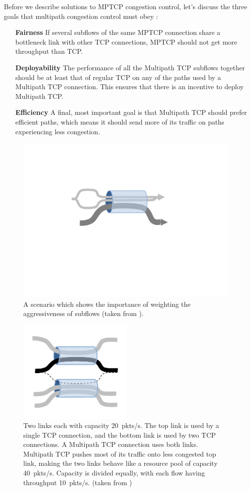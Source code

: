 Before we describe solutions to MPTCP congestion control, let's discuss the three goals that
multipath congestion control must obey \cite{mptcp-cc}:
\begin{enumerate}
\item[\textbf{Fairness}] If several subflows of the same MPTCP connection
share a bottleneck link with other TCP connections, MPTCP should not
get more throughput than TCP. 
\item[\textbf{Deployability}] The performance of all the
Multipath TCP subflows together should be at least that of regular TCP
on any of the paths used by a Multipath TCP connection.  This ensures
that there is an incentive to deploy Multipath TCP. 
\item[\textbf{Efficiency}] A final, most important goal is that Multipath TCP should prefer efficient paths,
which means it should send more of its traffic on paths experiencing
less congestion.
\end{enumerate}

\begin{figure}[t]
\centering
\includegraphics*[width=0.45\columnwidth,bb=167 245 509 380]{figures/1bottleneck}
\caption{A scenario which shows the importance of weighting the aggressiveness of subflows (taken from \cite{mptcp-cc}).}
\label{fig:1bottleneck}
\end{figure}

\begin{figure}[t]
\centering
\includegraphics[width=0.5\textwidth]{figures/figure1}
\caption{Two links each with capacity 20~pkts/s. The top link is used by a single TCP connection,
and the bottom link is used by two TCP connections. A Multipath TCP connection uses
both links. Multipath TCP pushes most of its traffic onto less congested top link,
making the two links behave like a resource pool of capacity 40~pkts/s. Capacity is divided equally,
with each flow having throughput 10~pkts/s. (taken from \cite{mptcp-cc})}
\label{fig:mptcp1}
\end{figure}

